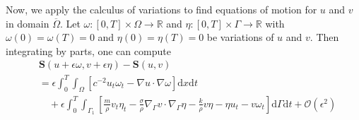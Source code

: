 \documentclass[10pt]{elsarticle}
\begin{document}
Now, we apply the calculus of variations to find equations of motion for $u$ and $v$ in domain $\overline{\Omega}$. Let $\omega: [0, T]\times\Omega\rightarrow\mathbb{R}$ and $\eta: [0, T]\times\Gamma\rightarrow\mathbb{R}$ with $\omega(0)=\omega(T)=0$ and $\eta(0)=\eta(T)=0$ be variations of $u$ and $v$. Then integrating by parts, one can compute
\begin{equation*}
\begin{split}
&\mathbf{S}(u+\epsilon\omega, v+\epsilon\eta) - \mathbf{S}(u, v)\\
&= \epsilon\int_{0}^{T}\int_{\Omega}\left[ c^{-2}u_t\omega_t - \nabla u\cdot\nabla\omega\right]\mathrm{d}x\mathrm{d}t\\
&\quad+\epsilon\int_{0}^{T}\int_{\Gamma_1}\left[ \frac{m}{\rho} v_t\eta_t -\frac{\sigma}{\rho}\nabla_{\Gamma}v\cdot\nabla_{\Gamma}\eta - \frac{k}{\rho} v\eta - \eta u_t -  v\omega_t \right]\mathrm{d}\Gamma \mathrm{d}t +\mathcal{O}(\epsilon^2)
\end{split}
\end{equation*}
\end{document}
